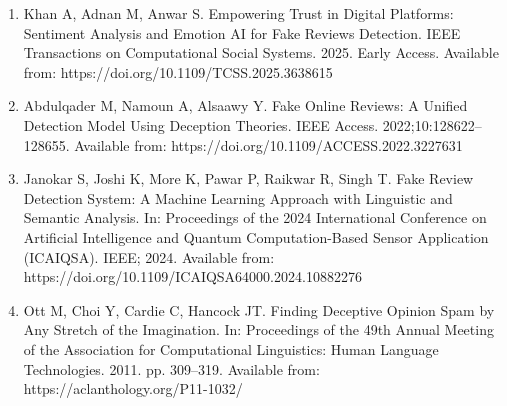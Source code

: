\documentclass[12pt,a4paper]{report}
\begin{document}
\begin{enumerate}

    \item Khan A, Adnan M, Anwar S.
    Empowering Trust in Digital Platforms:
    Sentiment Analysis and Emotion AI for
    Fake Reviews Detection.
    IEEE Transactions on Computational Social Systems.
    2025. Early Access.
    Available from: https://doi.org/10.1109/TCSS.2025.3638615

    \item Abdulqader M, Namoun A, Alsaawy Y.
    Fake Online Reviews: A Unified Detection Model
    Using Deception Theories.
    IEEE Access. 2022;10:128622--128655.
    Available from: https://doi.org/10.1109/ACCESS.2022.3227631

    \item Janokar S, Joshi K, More K, Pawar P,
    Raikwar R, Singh T.
    Fake Review Detection System:
    A Machine Learning Approach with
    Linguistic and Semantic Analysis.
    In: Proceedings of the 2024 International
    Conference on Artificial Intelligence and
    Quantum Computation-Based Sensor Application
    (ICAIQSA). IEEE; 2024.
    Available from: https://doi.org/10.1109/ICAIQSA64000.2024.10882276

    \item Ott M, Choi Y, Cardie C, Hancock JT.
    Finding Deceptive Opinion Spam by Any
    Stretch of the Imagination.
    In: Proceedings of the 49th Annual Meeting
    of the Association for Computational Linguistics:
    Human Language Technologies. 2011.
    pp. 309--319.
    Available from: https://aclanthology.org/P11-1032/

\end{enumerate}
\end{document}
